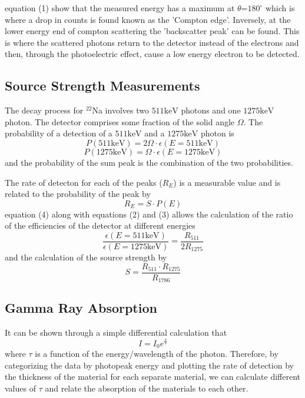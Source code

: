 \documentclass[11pt]{article} %
\begin{document}
        equation (1) show that the measured energy has a maximum at $\theta$=$180^{\circ}$ which is where a drop in counts is found known as the 'Compton edge'. Inversely, at the lower energy end of compton scattering the 'backscatter peak' can be found. This is where the scattered photons return to the detector instead of the electrons and then, through the photoelectric effect, cause a low energy electron to be detected.

    \subsection{Source Strength Measurements}
        The decay process for $^{22}$Na involves two $511\unit{\keV}$ photons and one $1275\unit{\keV}$ photon. The detector comprises some fraction of the solid angle $\Omega$. The probability of a detection of a $511\unit{\keV}$ and a $1275\unit{\keV}$ photon is
        \begin{equation}
            P(511\unit{\keV}) = 2\Omega\cdot\epsilon(E=511\unit{\keV})
        \end{equation}
        \begin{equation}
            P(1275\unit{\keV}) = \Omega\cdot\epsilon(E=1275\unit{\keV})
        \end{equation}
        and the probability of the sum peak is the combination of the two probabilities.
        
        The rate of detecton for each of the peaks ($R_E$) is a measurable value and is related to the probability of the peak by
        \begin{equation}
            R_E = S\cdot P(E)
        \end{equation}
        equation (4) along with equations (2) and (3) allows the calculation of the ratio of the efficiencies of the detector at different energies
        \begin{equation}
            \frac{\epsilon(E=511\unit{\keV})}{\epsilon(E=1275\unit{\keV})} = \frac{R_{511}}{2R_{1275}}
        \end{equation}
        and the calculation of the source strength by
        \begin{equation}
            S = \frac{R_{511}\cdot R_{1275}}{R_{1786}}
        \end{equation}
    \subsection{Gamma Ray Absorption}
        It can be shown through a simple differential calculation that
        \begin{equation}
            I = I_0 e^{\frac{x}{\tau}}
        \end{equation}
        where $\tau$ is a function of the energy/wavelength of the photon. Therefore, by categorizing the data by photopeak energy and plotting the rate of detection by the thickness of the material for each separate material, we can calculate different values of $\tau$ and relate the absorption of the materials to each other.
\end{document}
